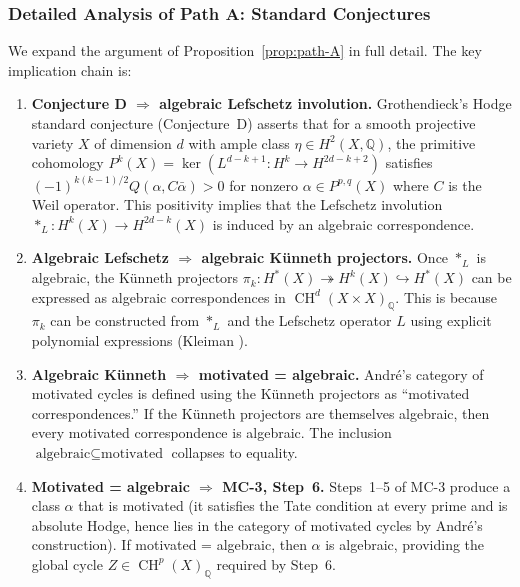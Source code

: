 \documentclass[11pt]{article}
\theoremstyle{definition}
\DeclareMathOperator{\CH}{CH}
\begin{document}
\subsubsection{Detailed Analysis of Path A: Standard Conjectures}
\label{sec:path-A-detail}

We expand the argument of Proposition~\ref{prop:path-A} in full detail.
The key implication chain is:

\begin{enumerate}[label=\textbf{(A\arabic*)}]
  \item \textbf{Conjecture D $\Rightarrow$ algebraic Lefschetz involution.}
    Grothendieck's Hodge standard conjecture (Conjecture~D) asserts that
    for a smooth projective variety $X$ of dimension $d$ with ample class
    $\eta \in H^2(X, \mathbb{Q})$, the primitive cohomology
    $P^k(X) = \ker(L^{d-k+1} : H^k \to H^{2d-k+2})$ satisfies
    $(-1)^{k(k-1)/2} Q(\alpha, C\bar{\alpha}) > 0$ for nonzero
    $\alpha \in P^{p,q}(X)$ where $C$ is the Weil operator.  This
    positivity implies that the Lefschetz involution $*_L : H^k(X) \to
    H^{2d-k}(X)$ is induced by an algebraic correspondence.

  \item \textbf{Algebraic Lefschetz $\Rightarrow$ algebraic K\"unneth projectors.}
    Once $*_L$ is algebraic, the K\"unneth projectors
    $\pi_k : H^*(X) \twoheadrightarrow H^k(X) \hookrightarrow H^*(X)$
    can be expressed as algebraic correspondences in $\CH^d(X \times X)_{\mathbb{Q}}$.
    This is because $\pi_k$ can be constructed from $*_L$ and the Lefschetz
    operator $L$ using explicit polynomial expressions
    (Kleiman \cite{Grothendieck}).

  \item \textbf{Algebraic K\"unneth $\Rightarrow$ motivated = algebraic.}
    Andr\'e's category of motivated cycles \cite{Andre} is defined using
    the K\"unneth projectors as ``motivated correspondences.'' If the
    K\"unneth projectors are themselves algebraic, then every motivated
    correspondence is algebraic.  The inclusion
    $\text{algebraic} \subseteq \text{motivated}$ collapses to equality.

  \item \textbf{Motivated = algebraic $\Rightarrow$ MC-3, Step~6.}
    Steps~1--5 of MC-3 produce a class $\alpha$ that is motivated (it
    satisfies the Tate condition at every prime and is absolute Hodge,
    hence lies in the category of motivated cycles by Andr\'e's construction).
    If motivated = algebraic, then $\alpha$ is algebraic, providing the
    global cycle $Z \in \CH^p(X)_{\mathbb{Q}}$ required by Step~6.
\end{enumerate}
\end{document}
